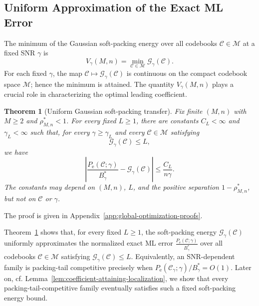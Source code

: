 \documentclass[12pt,draftclsnofoot,onecolumn]{IEEEtran}
\newcommand{\cC}{\mathcal{C}}
\newcommand{\cG}{\mathcal{G}}
\newcommand{\cM}{\mathcal{M}}
\newcommand{\Pe}{P_{\mathrm e}}
\newtheorem{theorem}{Theorem}
\theoremstyle{definition}
\begin{document}
\subsection{Uniform Approximation of the Exact ML Error}
\label{subsec:uniform-soft-packing-transfer}

The minimum of the Gaussian soft-packing energy over all codebooks
\(\cC\in\cM\) at a fixed SNR \(\gamma\) is
\begin{equation}
  V_\gamma(M,n)
  =\min_{\cC\in\cM}\cG_\gamma(\cC).
  \label{eq:soft-packing-optimum}
\end{equation}
For each fixed \(\gamma\), the map
\(\cC\mapsto\cG_\gamma(\cC)\) is continuous on the compact codebook
space \(\cM\); hence the minimum is attained.  The quantity
\(V_\gamma(M,n)\) plays a crucial role in characterizing the optimal leading
coefficient.

\begin{theorem}[Uniform Gaussian soft-packing transfer]
\label{thm:uniform-soft-packing-transfer}
Fix finite \((M,n)\) with \(M\ge2\) and \(\rho^{\ast}_{M,n}<1\).  For every fixed \(L\ge1\), there are constants \(C_L<\infty\) and \(\gamma_L<\infty\) such that, for every \(\gamma\ge\gamma_L\) and every \(\cC\in\cM\) satisfying
\begin{equation}
  \cG_\gamma(\cC)\le L,
  \label{eq:bounded-soft-packing-class}
\end{equation}
we have
\begin{equation}
  \left|
  \frac{\Pe(\cC;\gamma)}{B_\gamma^{\ast}}
  -\cG_\gamma(\cC)
  \right|
  \le \frac{C_L}{n\gamma}.
  \label{eq:uniform-soft-packing-transfer}
\end{equation}
The constants may depend on \((M,n)\), \(L\), and the positive
separation \(1-\rho^{\ast}_{M,n}\), but not on \(\cC\) or \(\gamma\).
\end{theorem}
\begin{IEEEproof}
The proof is given in
Appendix~\ref{app:global-optimization-proofs}.
\end{IEEEproof}

Theorem~\ref{thm:uniform-soft-packing-transfer} shows that, for every fixed \(L\geq1\),
the soft-packing energy \(\cG_\gamma(\cC)\) uniformly approximates the
normalized exact ML error
\(\frac{\Pe(\cC;\gamma)}{B_\gamma^{\ast}}\)
over all codebooks \(\cC\in\cM\) satisfying
\(\cG_\gamma(\cC)\leq L\).  Equivalently, an SNR-dependent family is
packing-tail competitive precisely when
\(\Pe(\cC_\gamma;\gamma)/B_\gamma^{\ast}=O(1)\).
Later on, cf. Lemma~\ref{lem:coefficient-attaining-localization}, we show that every
packing-tail-competitive family eventually satisfies such a fixed
soft-packing energy bound.
 
\end{document}
